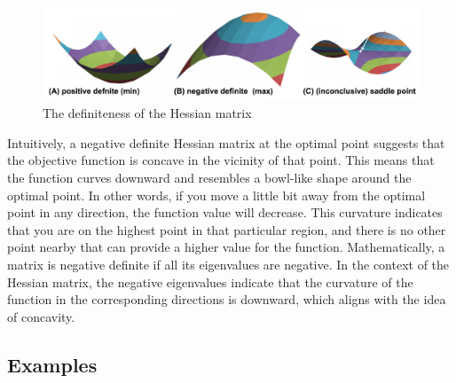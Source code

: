 \documentclass[11pt,a4paper]{book}
\theoremstyle{definition}\newtheorem{definition}{Definition}
\theoremstyle{definition}\newtheorem{fact}{Fact}
\theoremstyle{definition}\newtheorem{remark}{Remark}
\theoremstyle{definition}\newtheorem{ex}{Ex.}
\theoremstyle{definition}\newtheorem{project}{Project}
\theoremstyle{definition}\newtheorem{problem}{Problem}
\theoremstyle{definition}\newtheorem{example}{Example}
\numberwithin{theorem}{section}
\numberwithin{corollary}{chapter}
\numberwithin{assumption}{chapter}
\numberwithin{definition}{chapter}
\numberwithin{prop}{chapter}
\numberwithin{notation}{chapter}
\numberwithin{problem}{chapter}
\numberwithin{example}{chapter}
\numberwithin{fact}{chapter}
\numberwithin{ex}{chapter}
\begin{document}
	\begin{figure}[ht]
		\centering
		\includegraphics{figs/hessian.png}
		\caption{The definiteness of the Hessian matrix}
	\end{figure}
	
	Intuitively, a negative definite Hessian matrix at the optimal point suggests that the objective function is concave in the vicinity of that point. This means that the function curves downward and resembles a bowl-like shape around the optimal point. In other words, if you move a little bit away from the optimal point in any direction, the function value will decrease. This curvature indicates that you are on the highest point in that particular region, and there is no other point nearby that can provide a higher value for the function. Mathematically, a matrix is negative definite if all its eigenvalues are negative. In the context of the Hessian matrix, the negative eigenvalues indicate that the curvature of the function in the corresponding directions is downward, which aligns with the idea of concavity.
	
	\subsection{Examples}
	
\end{document}
